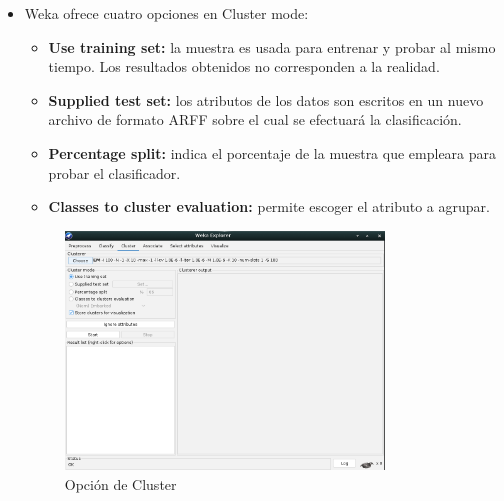 \documentclass[12pt]{article}
\begin{document}
\begin{itemize}
                    \item Weka ofrece cuatro opciones en Cluster mode:
                        \begin{itemize}
                            \item \textbf{Use training set:} la muestra es usada para entrenar y probar al mismo tiempo. Los resultados obtenidos no corresponden a la realidad.
                            \item \textbf{Supplied test set:}  los atributos de los datos son escritos en un nuevo archivo de formato ARFF sobre el cual se efectuará la clasificación.
                            \item \textbf{Percentage split:}  indica el porcentaje de la muestra que empleara para probar el clasificador. 
                            \item \textbf{Classes to cluster evaluation:} permite escoger el atributo a agrupar.
                        \end{itemize}

                        \newpage
                        \begin{figure}[!h]
                            \centering
                            \includegraphics[width=0.8\textwidth]{img/weka-12.png}
                            \caption{Opción de Cluster}
                        \end{figure}


\end{itemize}
\end{document}
